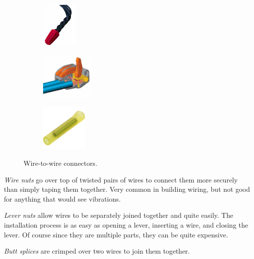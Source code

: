 \begin{figure}[H]
\begin{subfigure}[b]{.24\linewidth}
\includegraphics[height=0.9in]{imgs/connector_wirenut.jpeg}
\end{subfigure}\begin{subfigure}[b]{.24\linewidth}
\includegraphics[height=0.9in]{imgs/connector_levernut.png}
\end{subfigure}\begin{subfigure}[b]{.24\linewidth}
\includegraphics[height=0.9in]{imgs/connector_buttsplice.jpeg}
\end{subfigure}
\caption{Wire-to-wire connectors.}
\end{figure}

\begin{asparaenum}[a)]
  \item \textit{Wire nuts} go over top of twisted pairs of wires to connect them more securely than simply taping them together. Very common in building wiring, but not good for anything that would see vibrations.
  \item \textit{Lever nuts} allow wires to be separately joined together and quite easily. The installation process is as easy as opening a lever, inserting a wire, and closing the lever. Of course since they are multiple parts, they can be quite expensive.
  \item \textit{Butt splices} are crimped over two wires to join them together.
\end{asparaenum} 

